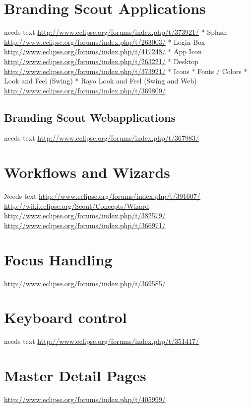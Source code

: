 \documentclass[a4paper,10pt,twoside]{book}
\begin{document}
\section{Branding Scout Applications}

needs text
\url{http://www.eclipse.org/forums/index.php/t/373921/}
* Splash \url{http://www.eclipse.org/forums/index.php/t/263003/}
* Login Box \url{http://www.eclipse.org/forums/index.php/t/417248/}
* App Icon \url{http://www.eclipse.org/forums/index.php/t/263221/}
* Desktop \url{http://www.eclipse.org/forums/index.php/t/373921/}
* Icons
* Fonts / Colors
* Look and Feel (Swing)
* Rayo Look and Feel (Swing and Web)
\url{http://www.eclipse.org/forums/index.php/t/369809/}

\subsection{Branding Scout Webapplications}
needs text
\url{http://www.eclipse.org/forums/index.php/t/367983/}

\section{Workflows and Wizards}
Needs text
\url{http://www.eclipse.org/forums/index.php/t/391607/}
\url{http://wiki.eclipse.org/Scout/Concepts/Wizard}
\url{http://www.eclipse.org/forums/index.php/t/382579/}
\url{http://www.eclipse.org/forums/index.php/t/366971/}

\section{Focus Handling}
\url{http://www.eclipse.org/forums/index.php/t/369585/}

\section{Keyboard control}
needs text
\url{http://www.eclipse.org/forums/index.php/t/351417/}

\section{Master Detail Pages}
\url{http://www.eclipse.org/forums/index.php/t/405999/}
\end{document}
